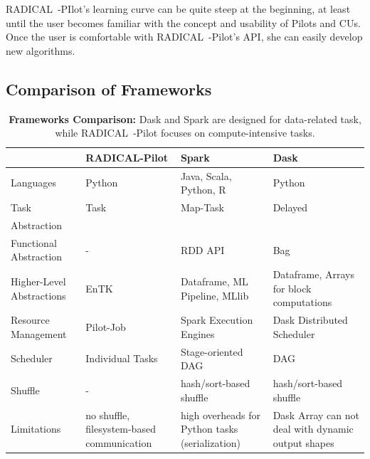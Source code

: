 RADICAL~-PIlot's learning curve can be quite steep at the beginning, at least until the user becomes familiar with the concept and usability of Pilots and CUs.
Once the user is comfortable with RADICAL~-Pilot's API, she can easily develop new algorithms.

\subsection{Comparison of Frameworks}
\begin{table}[t]
    \begin{tabular}{@{}p{3cm}|p{3.5cm}p{3.5cm}p{3.5cm}@{}}
        \toprule
        &\textbf{RADICAL-Pilot} &
        \textbf{Spark} &
        \textbf{Dask} \\
        \midrule
        Languages &
        Python &
        Java, Scala, Python, R &
        Python\\
        Task &
        Task &
        Map-Task &
        Delayed\\
        Abstraction &
        &
        & \\
        Functional Abstraction  &
        - &
        RDD API &
        Bag\\
        Higher-Level Abstractions &
        EnTK~\cite{balasubramanian2018harnessing} &
        Dataframe, ML Pipeline, MLlib~\cite{meng2016mllib} &
        Dataframe, Arrays for block computations\\
        Resource Management &
        Pilot-Job &
        Spark Execution Engines &
        Dask Distributed Scheduler\\
        Scheduler    &
        Individual Tasks &
        Stage-oriented DAG &
        DAG\\
        Shuffle      &
        -       &
        hash/sort-based shuffle &
        hash/sort-based shuffle\\
        Limitations &
        no shuffle, filesystem-based communication  &
        high overheads for Python tasks (serialization)   &
        Dask Array can not deal with dynamic output shapes\\
        \bottomrule
    \end{tabular}
    \caption{\textbf{Frameworks Comparison:} Dask and Spark are designed for data-related task, while RADICAL~-Pilot focuses on compute-intensive tasks.\label{tab:frameworks}}
\end{table}

